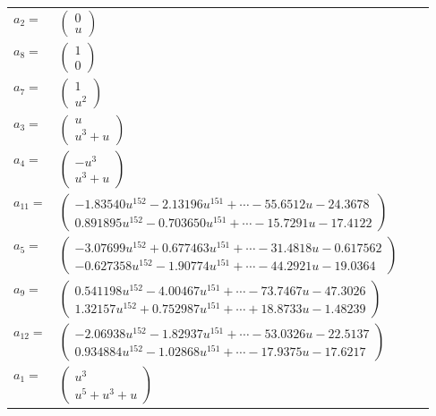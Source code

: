 \documentclass[1p]{elsarticle_modified}
\theoremstyle{definition}
\begin{document}
\begin{tabular}{m{7pt} m{180pt} m{7pt} m{180pt} }
\flushright $a_{2}=$&$\begin{pmatrix}0\\u\end{pmatrix}$ \\
\flushright $a_{8}=$&$\begin{pmatrix}1\\0\end{pmatrix}$ \\
\flushright $a_{7}=$&$\begin{pmatrix}1\\u^2\end{pmatrix}$ \\
\flushright $a_{3}=$&$\begin{pmatrix}u\\u^3+u\end{pmatrix}$ \\
\flushright $a_{4}=$&$\begin{pmatrix}- u^3\\u^3+u\end{pmatrix}$ \\
\flushright $a_{11}=$&$\begin{pmatrix}-1.83540 u^{152}-2.13196 u^{151}+\cdots-55.6512 u-24.3678\\0.891895 u^{152}-0.703650 u^{151}+\cdots-15.7291 u-17.4122\end{pmatrix}$ \\
\flushright $a_{5}=$&$\begin{pmatrix}-3.07699 u^{152}+0.677463 u^{151}+\cdots-31.4818 u-0.617562\\-0.627358 u^{152}-1.90774 u^{151}+\cdots-44.2921 u-19.0364\end{pmatrix}$ \\
\flushright $a_{9}=$&$\begin{pmatrix}0.541198 u^{152}-4.00467 u^{151}+\cdots-73.7467 u-47.3026\\1.32157 u^{152}+0.752987 u^{151}+\cdots+18.8733 u-1.48239\end{pmatrix}$ \\
\flushright $a_{12}=$&$\begin{pmatrix}-2.06938 u^{152}-1.82937 u^{151}+\cdots-53.0326 u-22.5137\\0.934884 u^{152}-1.02868 u^{151}+\cdots-17.9375 u-17.6217\end{pmatrix}$ \\
\flushright $a_{1}=$&$\begin{pmatrix}u^3\\u^5+u^3+u\end{pmatrix}$ \\

\end{tabular}
\end{document}
